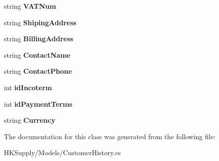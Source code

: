 \begin{DoxyCompactItemize}
string {\bfseries V\+A\+T\+Num}
\item 
\mbox{\label{class_h_k_supply_1_1_models_1_1_customer_history_a070235e24d0fec344a2a62a2ea07fc4a}} 
string {\bfseries Shiping\+Address}
\item 
\mbox{\label{class_h_k_supply_1_1_models_1_1_customer_history_a8c60f8d3185afeb8764d61bde61b89bb}} 
string {\bfseries Billing\+Address}
\item 
\mbox{\label{class_h_k_supply_1_1_models_1_1_customer_history_a66da89d7a3551f633f2e746a7f65191e}} 
string {\bfseries Contact\+Name}
\item 
\mbox{\label{class_h_k_supply_1_1_models_1_1_customer_history_a5f2166fba0c1b036b6575c82f87663f2}} 
string {\bfseries Contact\+Phone}
\item 
\mbox{\label{class_h_k_supply_1_1_models_1_1_customer_history_a6b809f3d0b5fe9d8190ae0da6eec755d}} 
int {\bfseries id\+Incoterm}
\item 
\mbox{\label{class_h_k_supply_1_1_models_1_1_customer_history_a270736531e1daea68584ede06d30ae9d}} 
int {\bfseries id\+Payment\+Terms}
\item 
\mbox{\label{class_h_k_supply_1_1_models_1_1_customer_history_af03e1c8bfde2907a2fe4ee4d03394fe5}} 
string {\bfseries Currency}
\end{DoxyCompactItemize}


The documentation for this class was generated from the following file\+:\begin{DoxyCompactItemize}
\item 
H\+K\+Supply/\+Models/Customer\+History.\+cs\end{DoxyCompactItemize}
